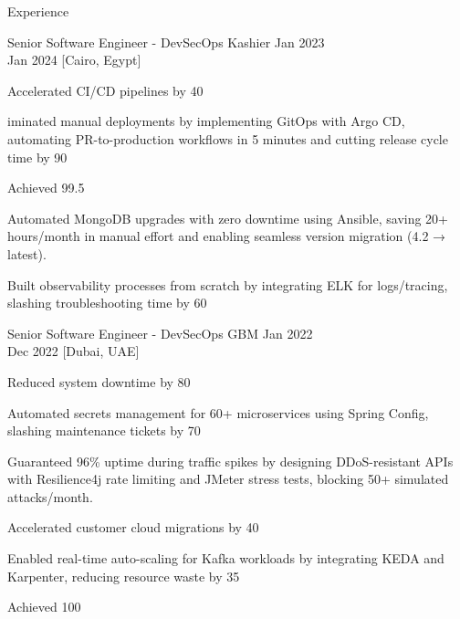 \begin{rSection}{Experience}
    \begin{rSubsection}
        {Senior Software Engineer - DevSecOps}
        {Kashier}
        {Jan 2023 \\ Jan 2024}
        [Cairo, Egypt]
        \begin{rItemize}
            \item Accelerated CI/CD pipelines by 40%
            \item iminated manual deployments by implementing GitOps with Argo CD, automating PR-to-production workflows in 5 minutes and cutting release cycle time by 90%
            \item Achieved 99.5%
            \item Automated MongoDB upgrades with zero downtime using Ansible, saving 20+ hours/month in manual effort and enabling seamless version migration (4.2 → latest).
            \item Built observability processes from scratch by integrating ELK for logs/tracing, slashing troubleshooting time by 60%
        \end{rItemize}
    \end{rSubsection}

    \begin{rSubsection}
        {Senior Software Engineer - DevSecOps}
        {GBM}
        {Jan 2022 \\ Dec 2022}
        [Dubai, UAE]
        \begin{rItemize}
            \item Reduced system downtime by 80%
            \item Automated secrets management for 60+ microservices using Spring Config, slashing maintenance tickets by 70%
            \item Guaranteed 96\% uptime during traffic spikes by designing DDoS-resistant APIs with Resilience4j rate limiting and JMeter stress tests, blocking 50+ simulated attacks/month.
            \item Accelerated customer cloud migrations by 40%
            \item Enabled real-time auto-scaling for Kafka workloads by integrating KEDA and Karpenter, reducing resource waste by 35%
            \item Achieved 100%
        \end{rItemize}
    \end{rSubsection}


\end{rSection}
